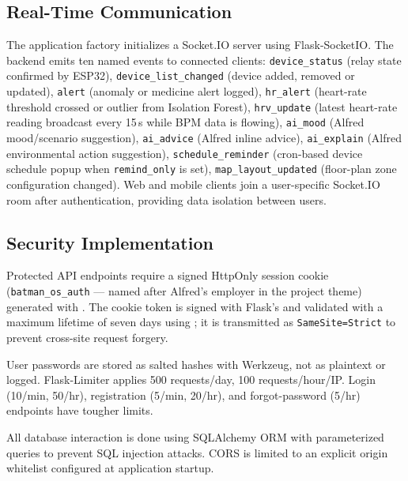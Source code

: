 \subsection{Real-Time Communication}

The application factory initializes a Socket.IO server using Flask-SocketIO.
The backend emits ten named events to connected clients:
\texttt{device\_status} (relay state confirmed by ESP32), \texttt{device\_list\_changed} (device added, removed or updated), \texttt{alert} (anomaly or medicine alert logged), \texttt{hr\_alert} (heart-rate threshold crossed or outlier from Isolation Forest), \texttt{hrv\_update} (latest heart-rate reading broadcast every 15\,s while BPM data is flowing), \texttt{ai\_mood} (Alfred mood/scenario suggestion), \texttt{ai\_advice} (Alfred inline advice), \texttt{ai\_explain} (Alfred environmental action suggestion), \texttt{schedule\_reminder} (cron-based device schedule popup when \texttt{remind\_only} is set), \texttt{map\_layout\_updated} (floor-plan zone configuration changed).
Web and mobile clients join a user-specific Socket.IO room after authentication, providing data isolation between users.

\subsection{Security Implementation}

Protected API endpoints require a signed HttpOnly session cookie (\texttt{batman\_os\_auth} --- named after Alfred's employer in the project theme) generated with . The cookie token is signed with Flask's  and validated with a maximum lifetime of seven days using ; it is transmitted as \texttt{SameSite=Strict} to prevent cross-site request forgery.

User passwords are stored as salted hashes with Werkzeug, not as plaintext or logged. Flask-Limiter applies 500 requests/day, 100 requests/hour/IP. Login (10/min, 50/hr), registration (5/min, 20/hr), and forgot-password (5/hr) endpoints have tougher limits.

All database interaction is done using SQLAlchemy ORM with parameterized queries to prevent SQL injection attacks. CORS is limited to an explicit origin whitelist configured at application startup.

